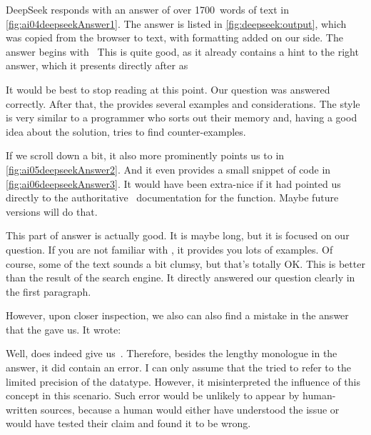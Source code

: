 \begin{noglslink}
DeepSeek responds with an answer of over 1700~words of text in \cref{fig:ai04deepseekAnswer1}.
The answer is listed in \cref{fig:deepseek:output}, which was copied from the browser to text, with formatting added on our side.
The answer begins with~\emph{}
This is quite good, as it already contains a hint to the right answer, which it presents directly after as~\emph{}

It would be best to stop reading at this point.
Our question was answered correctly.
After that, the  provides several examples and considerations.
The style is very similar to a programmer who sorts out their memory and, having a good idea about the solution, tries to find counter-examples.

If we scroll down a bit, it also more prominently points us to  in \cref{fig:ai05deepseekAnswer2}.
And it even provides a small snippet of code in \cref{fig:ai06deepseekAnswer3}.
It would have been extra-nice if it had pointed us directly to the authoritative \python\ documentation for the function.
Maybe future versions will do that.

This part of answer is actually good.
It is maybe long, but it is focused on our question.
If you are not familiar with , it provides you lots of examples.
Of course, some of the text sounds a bit clumsy, but that's totally OK.
This is better than the result of the search engine.
It directly answered our question clearly in the first paragraph.

However, upon closer inspection, we also can also find a mistake in the answer that the  gave us.
It wrote:
%
\begin{quotation}{}\end{quotation}%
%
Well,  does indeed give us~.
Therefore, besides the lengthy monologue in the answer, it did contain an error.
I can only assume that the  tried to refer to the limited precision of the  datatype.
However, it misinterpreted the influence of this concept in this scenario.
Such error would be unlikely to appear by human-written sources, because a human would either have understood the issue or would have tested their claim and found it to be wrong.


\end{noglslink}
